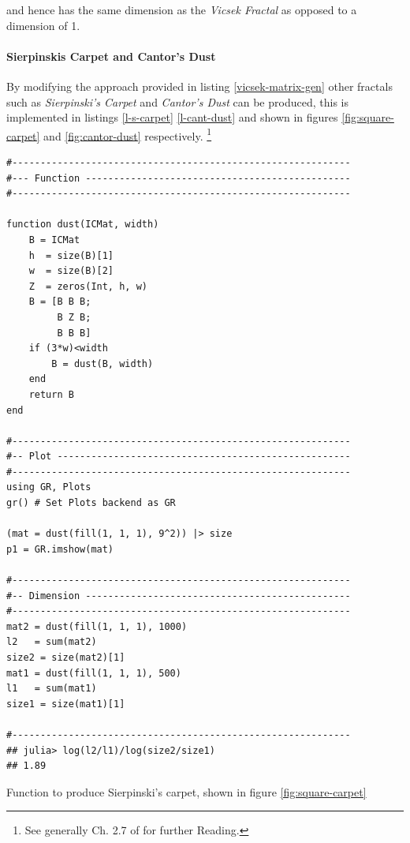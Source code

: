 \documentclass[a4paper,11pt,twoside]{article}
\begin{document}
and hence has the same dimension as the \emph{Vicsek Fractal} as opposed to a
dimension of 1.

\paragraph{Sierpinskis Carpet and Cantor's Dust}
\label{sec:orga232829}
By modifying the approach provided in listing \ref{vicsek-matrix-gen} other fractals
such as \emph{Sierpinski's Carpet} and \emph{Cantor's Dust} can be produced, this is
implemented in listings \ref{l-s-carpet} \ref{l-cant-dust} and shown in figures
\ref{fig:square-carpet} and \ref{fig:cantor-dust} respectively. \footnote{See generally Ch. 2.7 of \cite[\S 2.7]{peitgenChaosFractalsNew2004} for further Reading.}

\begin{listing}[htbp]
\begin{verbatim}
#------------------------------------------------------------
#--- Function -----------------------------------------------
#------------------------------------------------------------

function dust(ICMat, width)
    B = ICMat
    h  = size(B)[1]
    w  = size(B)[2]
    Z  = zeros(Int, h, w)
    B = [B B B;
         B Z B;
         B B B]
    if (3*w)<width
        B = dust(B, width)
    end
    return B
end

#------------------------------------------------------------
#-- Plot ----------------------------------------------------
#------------------------------------------------------------
using GR, Plots
gr() # Set Plots backend as GR

(mat = dust(fill(1, 1, 1), 9^2)) |> size
p1 = GR.imshow(mat)

#------------------------------------------------------------
#-- Dimension -----------------------------------------------
#------------------------------------------------------------
mat2 = dust(fill(1, 1, 1), 1000)
l2   = sum(mat2)
size2 = size(mat2)[1]
mat1 = dust(fill(1, 1, 1), 500)
l1   = sum(mat1)
size1 = size(mat1)[1]

#------------------------------------------------------------
## julia> log(l2/l1)/log(size2/size1)
## 1.89
\end{verbatim}
\caption{\label{l-s-carpet}Function to produce Sierpinski's carpet, shown in figure \ref{fig:square-carpet}}
\end{listing}
\end{document}
